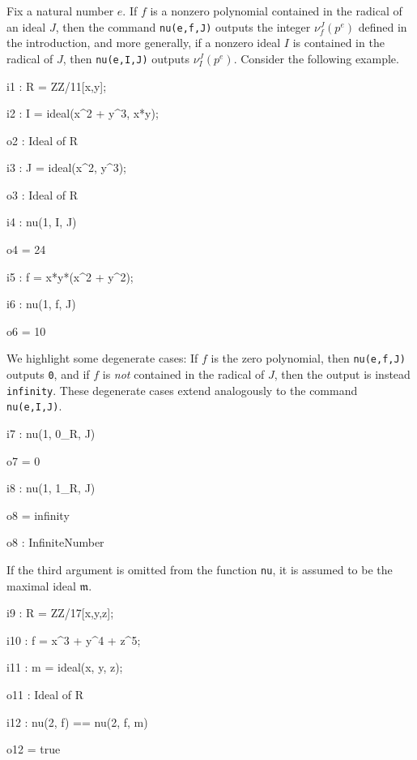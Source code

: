 \documentclass{amsart}
\newcommand{\idealm}{\mathfrak{m}}
\begin{document}
Fix a natural number $e$.  If $f$ is a nonzero polynomial contained in the radical of an ideal $J$, then the command {\tt nu(e,f,J)} outputs the integer $\nu_f^J(p^e)$ defined in the introduction, and
more generally, if a nonzero ideal $I$ is contained in the radical of $J$, then {\tt nu(e,I,J)} outputs $\nu_I^J(p^e)$. Consider the following example.  %

\medspace
{\small
{}
\begin{MyVerbatim}

i1 : R = ZZ/11[x,y];

i2 : I = ideal(x^2 + y^3, x*y);

o2 : Ideal of R

i3 : J = ideal(x^2, y^3);

o3 : Ideal of R

i4 : nu(1, I, J)

o4 = 24

i5 : f = x*y*(x^2 + y^2);

i6 : nu(1, f, J)

o6 = 10
\end{MyVerbatim}
}
\medspace


We highlight some degenerate cases:  If $f$ is the zero polynomial, then {\tt nu(e,f,J)} outputs {\tt 0}, and if $f$ is \emph{not} contained in the radical of $J$, then the output is instead {\tt infinity}.  These degenerate cases extend analogously to the command {\tt nu(e,I,J)}.

\medspace
{\small
{}
\begin{MyVerbatim}

i7 : nu(1, 0_R, J)

o7 = 0

i8 : nu(1, 1_R, J)

o8 = infinity

o8 : InfiniteNumber
\end{MyVerbatim}
}
\medspace


If the third argument is omitted from the function {\tt nu}, it is assumed to be the maximal ideal $\idealm$.

\medspace
{\small
{}
\begin{MyVerbatim}

i9 : R = ZZ/17[x,y,z];

i10 : f = x^3 + y^4 + z^5;

i11 : m = ideal(x, y, z);

o11 : Ideal of R

i12 : nu(2, f) == nu(2, f, m)

o12 = true
\end{MyVerbatim}
}
\medspace
\end{document}
